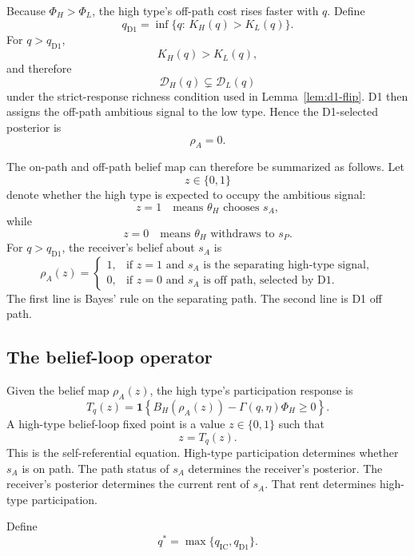 Because \(\Phi_H>\Phi_L\), the high type's off-path cost rises faster with \(q\). Define
\[
q_{\mathrm{D1}}
=
\inf\{q:\,K_H(q)>K_L(q)\}.
\]
For \(q>q_{\mathrm{D1}}\),
\[
K_H(q)>K_L(q),
\]
and therefore
\[
\mathcal D_H(q)\subsetneq \mathcal D_L(q)
\]
under the strict-response richness condition used in Lemma~\ref{lem:d1-flip}. D1 then assigns the off-path ambitious signal to the low type. Hence the D1-selected posterior is
\[
\rho_A=0.
\]

The on-path and off-path belief map can therefore be summarized as follows. Let
\[
z\in\{0,1\}
\]
denote whether the high type is expected to occupy the ambitious signal:
\[
z=1 \quad\text{means } \theta_H \text{ chooses }s_A,
\]
while
\[
z=0 \quad\text{means } \theta_H \text{ withdraws to }s_P.
\]
For \(q>q_{\mathrm{D1}}\), the receiver's belief about \(s_A\) is
\[
\rho_A(z)=
\begin{cases}
1, & \text{if }z=1\text{ and }s_A\text{ is the separating high-type signal},\\
0, & \text{if }z=0\text{ and }s_A\text{ is off path, selected by D1}.
\end{cases}
\]
The first line is Bayes' rule on the separating path. The second line is D1 off path.

\subsection{The belief-loop operator}
\label{subsec:belief-loop-operator}

Given the belief map \(\rho_A(z)\), the high type's participation response is
\[
T_q(z)
=
\mathbf{1}\left\{
B_H(\rho_A(z))-\Gamma(q,\eta)\Phi_H\ge 0
\right\}.
\]
A high-type belief-loop fixed point is a value \(z\in\{0,1\}\) such that
\[
z=T_q(z).
\]
This is the self-referential equation. High-type participation determines whether \(s_A\) is on path. The path status of \(s_A\) determines the receiver's posterior. The receiver's posterior determines the current rent of \(s_A\). That rent determines high-type participation.

Define
\[
q^*=\max\{q_{\mathrm{IC}},q_{\mathrm{D1}}\}.
\]

